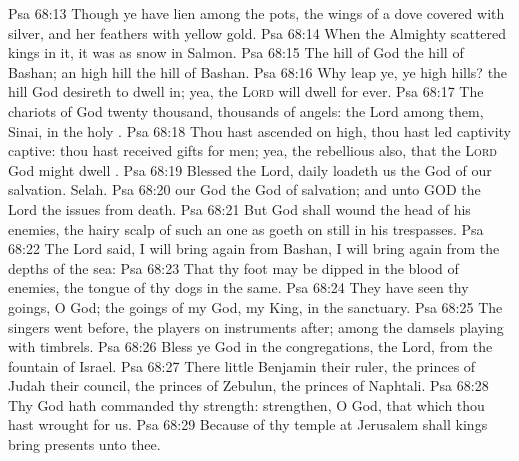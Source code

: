 \vs Psa 68:13 Though ye have lien among the pots,  the wings of a dove covered with silver, and her feathers with yellow gold.
\vs Psa 68:14 When the Almighty scattered kings in it, it was  as snow in Salmon.
\vs Psa 68:15 The hill of God  the hill of Bashan; an high hill  the hill of Bashan.
\vs Psa 68:16 Why leap ye, ye high hills?  the hill  God desireth to dwell in; yea, the \textsc{Lord} will dwell  for ever.
\vs Psa 68:17 The chariots of God  twenty thousand,  thousands of angels: the Lord  among them,  Sinai, in the holy .
\vs Psa 68:18 Thou hast ascended on high, thou hast led captivity captive: thou hast received gifts for men; yea,  the rebellious also, that the \textsc{Lord} God might dwell .
\vs Psa 68:19 Blessed  the Lord,  daily loadeth us  the God of our salvation. Selah.
\vs Psa 68:20  our God  the God of salvation; and unto GOD the Lord  the issues from death.
\vs Psa 68:21 But God shall wound the head of his enemies,  the hairy scalp of such an one as goeth on still in his trespasses.
\vs Psa 68:22 The Lord said, I will bring again from Bashan, I will bring  again from the depths of the sea:
\vs Psa 68:23 That thy foot may be dipped in the blood of  enemies,  the tongue of thy dogs in the same.
\vs Psa 68:24 They have seen thy goings, O God;  the goings of my God, my King, in the sanctuary.
\vs Psa 68:25 The singers went before, the players on instruments  after; among  the damsels playing with timbrels.
\vs Psa 68:26 Bless ye God in the congregations,  the Lord, from the fountain of Israel.
\vs Psa 68:27 There  little Benjamin  their ruler, the princes of Judah  their council, the princes of Zebulun,  the princes of Naphtali.
\vs Psa 68:28 Thy God hath commanded thy strength: strengthen, O God, that which thou hast wrought for us.
\vs Psa 68:29 Because of thy temple at Jerusalem shall kings bring presents unto thee.
